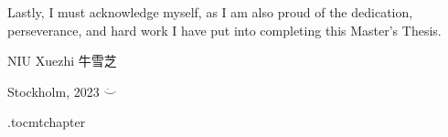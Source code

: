 Lastly, I must acknowledge myself, as I am also proud of the dedication, perseverance, and hard work I have put into completing this Master's Thesis.

\vspace{2cm}
\hfill NIU Xuezhi 牛雪芝

\hfill Stockholm, \monthname{ }2023 $\ddot\smile$

\newpage



\newpage

\etocdepthtag.toc{mtchapter}

\tableofcontents
\newpage